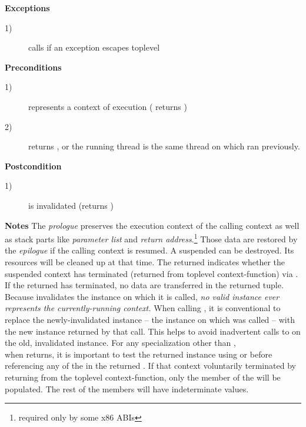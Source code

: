 {\bfseries Exceptions}
\begin{description}
    \item[1)] calls  if an exception escapes toplevel \\
\end{description}

{\bfseries Preconditions}
\begin{description}
    \item[1)]  represents a context of execution (\opbool
              returns )
    \item[2)]  returns , or the running thread is
              the same thread on which  ran previously.
\end{description}

{\bfseries Postcondition}
\begin{description}
    \item[1)]  is invalidated (\opbool returns )
\end{description}

{\bfseries Notes}
\newline
The \emph{prologue} preserves the execution context of the calling context as
well as stack parts like \emph{parameter list} and \emph{return
address}.\footnote{required only by some x86 ABIs}
Those data are restored by the \emph{epilogue} if the calling context is
resumed.
\newline
A suspended  can be destroyed. Its resources will be
cleaned up at that time.
\newline
The returned  indicates whether the suspended context
has terminated (returned from toplevel context-function) via \opbool. If the
returned  has terminated, no data are transferred in
the returned tuple.
\newline
Because \op invalidates the instance on which it is called, \emph{no
valid \ectx instance ever represents the currently-running context.}
\newline
When calling \op, it is conventional to replace the newly-invalidated 
instance -- the instance on which \op was called -- with the new instance
returned by that \op call. This helps to avoid inadvertent calls to \op on the
old, invalidated instance.
\newline
For any \ectx specialization other than \ectxvoid,\\
when \op returns, it is important to test the returned \ectxargs instance using
\opbool or  before referencing any of the  in the
returned \ectxargstup. If that context voluntarily terminated by returning
from the toplevel context-function, only the \ectxargs member of
the  will be populated. The rest of the members will have
indeterminate values.

